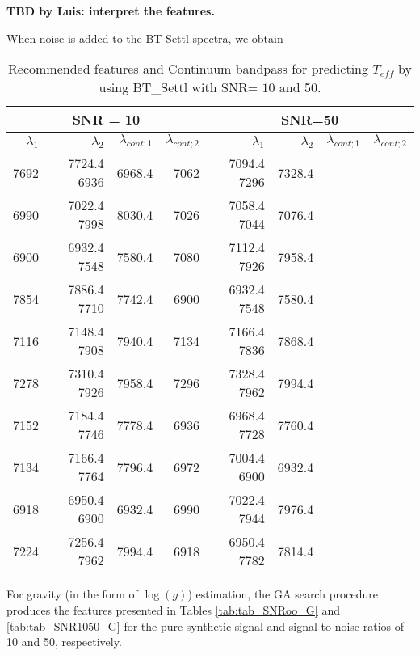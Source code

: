 {\bf TBD by Luis: interpret the features.}

When noise is added to the BT-Settl spectra, we obtain 


\begin{table}
\begin{center}
\begin{tabular}{rrrr | rrrr}
  \hline
 \multicolumn{4}{c}{SNR = 10} &  \multicolumn{4}{c}{SNR=50} \\
  \hline
$\lambda_1$ & $\lambda_2$ & $\lambda_{cont;1}$ & $\lambda_{cont;2} $ & $\lambda_1$ & $\lambda_2$ & $\lambda_{cont;1}$ & $\lambda_{cont;2} $ \\ 
  \hline
7692 & 7724.4 	6936 & 6968.4  & 7062 & 7094.4   7296 & 7328.4 \\
6990 & 7022.4 	7998 & 8030.4  & 7026 & 7058.4   7044 & 7076.4 \\
6900 & 6932.4 	7548 & 7580.4  & 7080 & 7112.4   7926 & 7958.4 \\
7854 & 7886.4 	7710 & 7742.4  & 6900 & 6932.4   7548 & 7580.4 \\
7116 & 7148.4 	7908 & 7940.4  & 7134 & 7166.4   7836 & 7868.4 \\
7278 & 7310.4 	7926 & 7958.4  & 7296 & 7328.4   7962 & 7994.4 \\
7152 & 7184.4 	7746 & 7778.4  & 6936 & 6968.4   7728 & 7760.4 \\
7134 & 7166.4 	7764 & 7796.4  & 6972 & 7004.4   6900 & 6932.4 \\
6918 & 6950.4 	6900 & 6932.4  & 6990 & 7022.4   7944 & 7976.4 \\
7224 & 7256.4 	7962 & 7994.4  & 6918 & 6950.4   7782 & 7814.4 \\
\hline
\end{tabular}
\caption {Recommended features and Continuum bandpass for predicting $ T_{eff} $ 
      by using BT\_Settl with SNR= $ 10 $ and 50.} \label{tab:tab_SNR1050_T} 
\end{center}
\end{table}

For gravity (in the form of $\log(g)$) estimation, the GA search
procedure produces the features presented in
Tables \ref{tab:tab_SNRoo_G} and \ref{tab:tab_SNR1050_G} for the pure
synthetic signal and signal-to-noise ratios of 10 and 50,
respectively.


